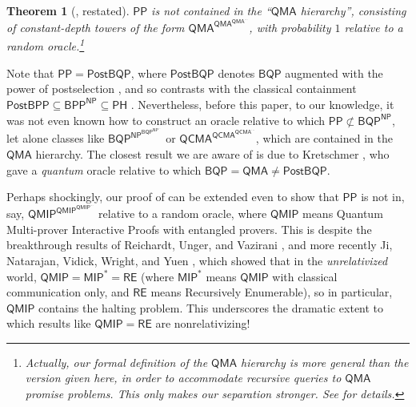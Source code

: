 \documentclass[11pt]{article}%
\newtheorem{theorem}{Theorem}
\begin{document}
\begin{theorem}[, restated]
\label{thm:pp_not_in_qmah_intro}
$\mathsf{PP}$ is not contained in the \emph{``$\mathsf{QMA}$ hierarchy''}, consisting of constant-depth towers of the form $\mathsf{QMA}^{\mathsf{QMA}^{\mathsf{QMA}^{\cdots}}}$, with probability $1$ relative to a random oracle.\footnote{Actually, our formal definition of the $\mathsf{QMA}$ hierarchy is more general than the version given here, in order to accommodate recursive queries to $\mathsf{QMA}$ promise problems. This only makes our separation stronger. See  for details.}
\end{theorem}

Note that $\mathsf{PP} = \mathsf{PostBQP}$, where $\mathsf{PostBQP}$ denotes $\mathsf{BQP}$ augmented with the power of postselection \cite{Aar05}, and so  contrasts with the classical containment $\mathsf{PostBPP} \subseteq \mathsf{BPP}^\mathsf{NP} \subseteq \mathsf{PH}$ \cite{HHT97,Kup15}. Nevertheless, before this paper, to our knowledge, it was not even known how to
construct an oracle relative to which $\mathsf{PP} \not\subset \mathsf{BQP}^\mathsf{NP}$, let alone classes like $\mathsf{BQP}^{\mathsf{NP}^{\mathsf{BQP}^{\mathsf{NP}^{\cdots}}}}$ or $\mathsf{QCMA}^{\mathsf{QCMA}^{\mathsf{QCMA}^{\cdots}}}$, which are contained in the $\mathsf{QMA}$ hierarchy. The closest result we are aware of is due to Kretschmer \cite{Kre21c}, who gave a \textit{quantum} oracle relative to which $\mathsf{BQP} = \mathsf{QMA} \neq \mathsf{PostBQP}$.

Perhaps shockingly, our proof of  can be extended even to show that $\mathsf{PP}$ is not in, say, $\mathsf{QMIP}^{\mathsf{QMIP}^{\mathsf{QMIP}^{\cdots}}}$ relative to a random oracle, where $\mathsf{QMIP}$ means Quantum Multi-prover Interactive Proofs with entangled provers.  This is despite the breakthrough results of Reichardt, Unger, and Vazirani \cite{RUV13}, and more recently Ji, Natarajan, Vidick, Wright, and Yuen \cite{JNVWY20}, which showed that in the \textit{unrelativized} world, $\mathsf{QMIP} = \mathsf{MIP}^* = \mathsf{RE}$ (where $\mathsf{MIP}^*$ means $\mathsf{QMIP}$ with classical communication only, and $\mathsf{RE}$ means Recursively Enumerable), so in particular, $\mathsf{QMIP}$ contains the halting problem.  This underscores the dramatic extent to which results like $\mathsf{QMIP} = \mathsf{RE}$ are nonrelativizing!
\end{document}
